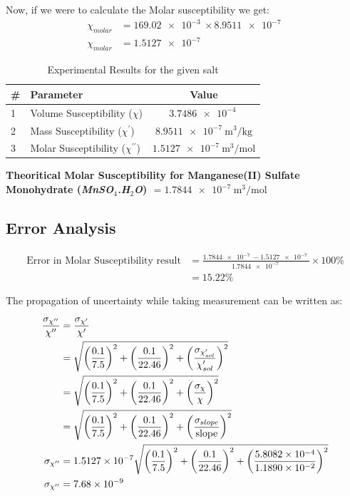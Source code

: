 \documentclass[../main.tex]{subfiles}
\begin{document}
Now, if we were to calculate the Molar susceptibility we get:
\begin{align*}
	\chi_{molar} &= \SI{169.02e-3}{} \times \SI{8.9511e-7}{} \\
	\chi_{molar} &= \SI{1.5127e-7}{}
\end{align*}

\begin{table}[H]
	\centering
	\caption{Experimental Results for the given salt}
	\begin{tabular}{llc}
		\toprule
		\# & Parameter & Value \\
		\midrule
		1 & Volume Susceptibility ($\chi$) & $\SI{3.7486e-4}{}$ \\
		2 & Mass Susceptibility ($\chi^{\prime}$) & $\SI{8.9511e-7}{\meter\cubed\per\kilo\gram}$ \\ 
		3 & Molar Susceptibility ($\chi^{\prime\prime}$) & $\SI{1.5127e-7}{\meter\cubed\per\mole}$ \\
		\bottomrule
	\end{tabular}
\end{table}
\textbf{Theoritical Molar Susceptibility for Manganese(II) Sulfate Monohydrate (\textit{MnSO$_4$.H$_2$O}) $= \SI{1.7844e-7}{\meter\cubed\per\mole}$}

\subsection*{Error Analysis}
\begin{align*}
	\textrm{Error in Molar Susceptibility result} &= \frac{\SI{1.7844e-7}{}-\SI{1.5127e-7}{}}{\SI{1.7844e-7}{}}\times 100\% \\
						      &= 15.22\%
\end{align*}

The propagation of uncertainty while taking measurement can be written as:

\begin{align*}
	\frac{ \sigma_{\chi^{\prime\prime}} }{ \chi^{\prime\prime} } &=  \frac{ \sigma_{\chi^{\prime}} }{ \chi^{\prime} } \\
								     &= \sqrt{ \left(\frac{0.1}{7.5}\right)^2 + \left(\frac{0.1}{22.46}\right)^2 + \left(\frac{ \sigma_{\chi^{\prime}_{sol}}}{ \chi^{\prime}_{sol} }\right)^2 } \\
								     &= \sqrt{ \left(\frac{0.1}{7.5}\right)^2 + \left(\frac{0.1}{22.46}\right)^2 + \left(\frac{\sigma_{\chi}}{\chi} \right)^2 } \\
								     &= \sqrt{ \left(\frac{0.1}{7.5}\right)^2 + \left(\frac{0.1}{22.46}\right)^2 + \left(\frac{\sigma_{slope}}{\textrm{slope}} \right)^2 } \\
	\sigma_{\chi^{\prime\prime}} &= \SI{1.5127e-7}{} \sqrt{ \left(\frac{0.1}{7.5}\right)^2 + \left(\frac{0.1}{22.46}\right)^2 + \left(\frac{\SI{5.8082e-04}{}}{\SI{1.1890e-02}{}} \right)^2 } \\
	\sigma_{\chi^{\prime\prime}} &= \SI{7.68e-9}{} 
\end{align*}
\end{document}
